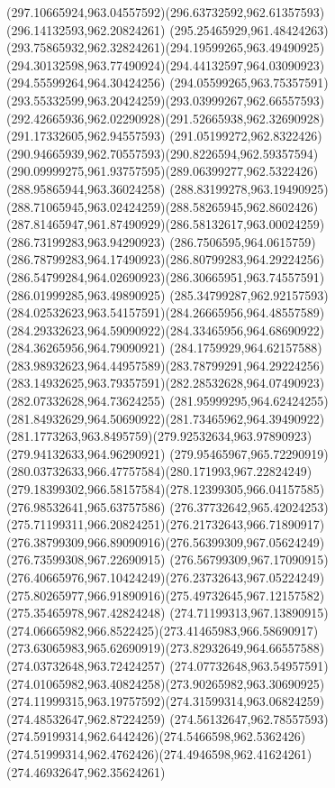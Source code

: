 {{		\curveto(297.10665924,963.04557592)(296.63732592,962.61357593)(296.14132593,962.20824261)
		\curveto(295.25465929,961.48424263)(293.75865932,962.32824261)(294.19599265,963.49490925)
		\curveto(294.30132598,963.77490924)(294.44132597,964.03090923)(294.55599264,964.30424256)
		\curveto(294.05599265,963.75357591)(293.55332599,963.20424259)(293.03999267,962.66557593)
		\curveto(292.42665936,962.02290928)(291.52665938,962.32690928)(291.17332605,962.94557593)
		\curveto(291.05199272,962.8322426)(290.94665939,962.70557593)(290.8226594,962.59357594)
		\curveto(290.09999275,961.93757595)(289.06399277,962.5322426)(288.95865944,963.36024258)
		\curveto(288.83199278,963.19490925)(288.71065945,963.02424259)(288.58265945,962.8602426)
		\curveto(287.81465947,961.87490929)(286.58132617,963.00024259)(286.73199283,963.94290923)
		\curveto(286.7506595,964.0615759)(286.78799283,964.17490923)(286.80799283,964.29224256)
		\curveto(286.54799284,964.02690923)(286.30665951,963.74557591)(286.01999285,963.49890925)
		\curveto(285.34799287,962.92157593)(284.02532623,963.54157591)(284.26665956,964.48557589)
		\curveto(284.29332623,964.59090922)(284.33465956,964.68690922)(284.36265956,964.79090921)
		\curveto(284.1759929,964.62157588)(283.98932623,964.44957589)(283.78799291,964.29224256)
		\curveto(283.14932625,963.79357591)(282.28532628,964.07490923)(282.07332628,964.73624255)
		\curveto(281.95999295,964.62424255)(281.84932629,964.50690922)(281.73465962,964.39490922)
		\curveto(281.1773263,963.8495759)(279.92532634,963.97890923)(279.94132633,964.96290921)
		\curveto(279.95465967,965.72290919)(280.03732633,966.47757584)(280.171993,967.22824249)
		\curveto(279.18399302,966.58157584)(278.12399305,966.04157585)(276.98532641,965.63757586)
		\curveto(276.37732642,965.42024253)(275.71199311,966.20824251)(276.21732643,966.71890917)
		\curveto(276.38799309,966.89090916)(276.56399309,967.05624249)(276.73599308,967.22690915)
		\curveto(276.56799309,967.17090915)(276.40665976,967.10424249)(276.23732643,967.05224249)
		\curveto(275.80265977,966.91890916)(275.49732645,967.12157582)(275.35465978,967.42824248)
		\curveto(274.71199313,967.13890915)(274.06665982,966.8522425)(273.41465983,966.58690917)
		\curveto(273.63065983,965.62690919)(273.82932649,964.66557588)(274.03732648,963.72424257)
		\curveto(274.07732648,963.54957591)(274.01065982,963.40824258)(273.90265982,963.30690925)
		\curveto(274.11999315,963.19757592)(274.31599314,963.06824259)(274.48532647,962.87224259)
		\curveto(274.56132647,962.78557593)(274.59199314,962.6442426)(274.5466598,962.5362426)
		\curveto(274.51999314,962.4762426)(274.4946598,962.41624261)(274.46932647,962.35624261)
}}
